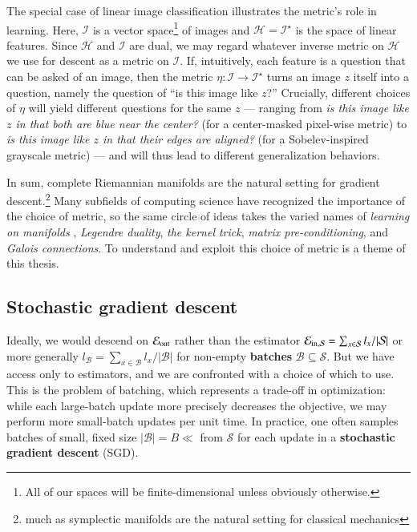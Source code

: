 \documentclass[openany, notitlepage, justified]{tufte-book}
\theoremstyle{plain}
\theoremstyle{definition}
\newcommand{\Bb}{\mathcal{B}}
\newcommand{\Hh}{\mathcal{H}}
\newcommand{\Ii}{\mathcal{I}}
\newcommand{\Ss}{\mathcal{S}}
\begin{document}
        The special case of linear image classification illustrates the
        metric's role in learning.  Here, $\Ii$ is a 
        vector space\footnote{
            All of our spaces will be finite-dimensional unless
            obviously otherwise.
        } of images and $\Hh = \Ii^\star$ is the space of linear features.
        Since $\Hh$ and $\Ii$ are dual, we may regard whatever inverse metric
        on $\Hh$ we use for descent as a metric on $\Ii$.  If, intuitively,
        each feature is a question that can be asked of an image, then the
        metric $\eta:\Ii\to\Ii^\star$ turns an image $z$ itself into a
        question, namely the question of ``is this image like $z$?''  Crucially,
        different choices of $\eta$ will yield different questions for the same
        $z$ ---
        ranging from
        \emph{is this image like $z$ in that both are blue near the center?}
        (for a center-masked pixel-wise metric)
        to
        \emph{is this image like $z$ in that their edges are aligned?}
        (for a Sobelev-inspired grayscale metric)
        --- and will thus lead to different generalization behaviors. 

        In sum, complete Riemannian manifolds are the natural
        setting for gradient descent.\footnote{
            much as symplectic manifolds are the natural setting for classical
            mechanics
        }
        Many subfields of computing science have recognized the importance
        of the choice of metric,
        so the same circle of ideas takes the varied names of \emph{learning on
        manifolds} \citep{bo13}, \emph{Legendre duality}, \emph{the kernel
        trick}, \emph{matrix pre-conditioning}, and \emph{Galois
        connections}.
        To understand and exploit this choice of metric is a theme of this
        thesis. 

        \subsection{Stochastic gradient descent}

            Ideally, we would descend on $\mathcal{E}_{\text{out}}$ rather than the estimator
            $\Ein = \sum_{x\in\Ss} l_x/|\Ss|$ or more generally $l_\Bb =
            \sum_{x\in\Bb} l_x/|\Bb|$ for non-empty \textbf{batches}
            $\Bb\subseteq\Ss$.  But we have access only to estimators, and we
            are confronted with a choice of which to use.  This is the problem
            of batching, which represents a trade-off in optimization: while
            each large-batch update more precisely decreases the objective, we
            may perform more small-batch updates per unit time.  In practice,
            one often samples batches of small, fixed size $|\Bb|=B \ll $ from
            $\Ss$ for each update in a \textbf{stochastic gradient descent}
            (SGD).
\end{document}

